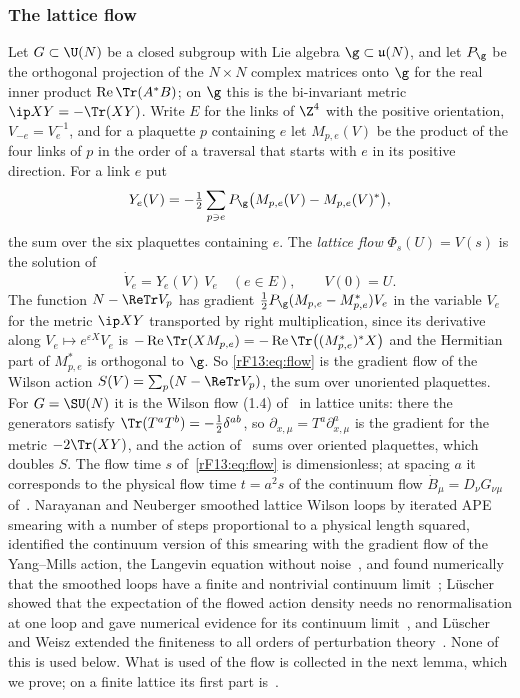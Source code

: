 \subsubsection{The lattice flow}

Let $G\subset\U(N)$ be a closed subgroup with Lie algebra $\g\subset
\mathfrak u(N)$, and let $P_\g$ be the orthogonal projection of the
$N\times N$ complex matrices onto $\g$ for the real inner product
$\operatorname{Re}\Tr(A^*B)$; on $\g$ this is the bi-invariant metric
$\ip XY=-\Tr(XY)$. Write $E$ for the links of $\Z^4$ with the positive
orientation, $V_{-e}=V_e^{-1}$, and for a plaquette $p$ containing $e$ let
$M_{p,e}(V)$ be the product of the four links of $p$ in the order of a
traversal that starts with $e$ in its positive direction. For a link $e$ put
\begin{equation}\label{rF13:eq:Y}
Y_e(V)=-\tfrac12\sum_{p\ni e}P_\g\bigl(M_{p,e}(V)-M_{p,e}(V)^*\bigr),
\end{equation}
the sum over the six plaquettes containing $e$. The \emph{lattice flow}
$\Phi_s(U)=V(s)$ is the solution of
\begin{equation}\label{rF13:eq:flow}
\dot V_e=Y_e(V)\,V_e\quad(e\in E),\qquad V(0)=U .
\end{equation}
The function $N-\ReTr V_p$ has gradient $\frac12P_\g(M_{p,e}-M_{p,e}^*)V_e$ in
the variable $V_e$ for the metric $\ip XY$ transported by right
multiplication, since its derivative along $V_e\mapsto e^{\varepsilon X}V_e$ is
$-\operatorname{Re}\Tr(XM_{p,e})=-\operatorname{Re}\Tr\bigl((M_{p,e}^*)^*X\bigr)$
and the Hermitian part of $M_{p,e}^*$ is orthogonal to $\g$. So
\eqref{rF13:eq:flow} is the gradient flow of the Wilson action
$S(V)=\sum_p(N-\ReTr V_p)$, the sum over unoriented plaquettes. For
$G=\SU(N)$ it is the Wilson flow (1.4) of~\cite{Lus10} in lattice units:
there the generators satisfy $\Tr(T^aT^b)=-\frac12\delta^{ab}$, so
$\partial_{x,\mu}=T^a\partial^a_{x,\mu}$ is the gradient for the metric
$-2\Tr(XY)$, and the action of~\cite{Lus10} sums over oriented plaquettes,
which doubles $S$. The flow time $s$ of~\eqref{rF13:eq:flow} is
dimensionless; at spacing $a$ it corresponds to the physical flow time
$t=a^2s$ of the continuum flow $\dot B_\mu=D_\nu G_{\nu\mu}$ of~\cite[(1.1)]{Lus10}.
Narayanan and Neuberger smoothed lattice Wilson loops by iterated APE
smearing with a number of steps proportional to a physical length squared,
identified the continuum version of this smearing with the gradient flow of
the Yang--Mills action, the Langevin equation without noise~\cite[Sec.~4.1,
(4.1)]{NN06}, and found
numerically that the smoothed loops have a finite and nontrivial continuum
limit~\cite{NN06}; L\"uscher showed that the expectation of the flowed action
density needs no renormalisation at one loop and gave numerical evidence
for its continuum limit~\cite{Lus10}, and L\"uscher and Weisz extended the
finiteness to all orders of perturbation theory~\cite{LW11}. None of this is
used below. What is used of the flow is collected in the next lemma, which
we prove; on a finite lattice its first part is~\cite[Sec.~3.1]{Lus09}.

